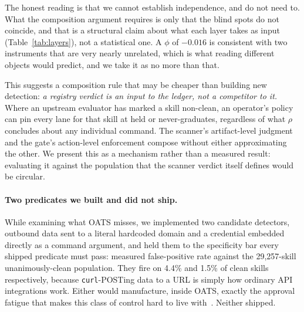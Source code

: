\documentclass[10pt]{article}
\begin{document}
The honest reading is that we cannot establish independence, and do not need to. What
the composition argument requires is only that the blind spots do not coincide, and
that is a structural claim about what each layer takes as input (Table~\ref{tab:layers}),
not a statistical one. A $\phi$ of $-0.016$ is consistent with two instruments that
are very nearly unrelated, which is what reading different objects would predict, and
we take it as no more than that.

This suggests a composition rule that may be cheaper than building new detection:
\emph{a registry verdict is an input to the ledger, not a competitor to it.} Where
an upstream evaluator has marked a skill non-clean, an operator's policy can pin
every lane for that skill at held or never-graduates, regardless of what $\rho$
concludes about any individual command. The scanner's artifact-level judgment and
the gate's action-level enforcement compose without either approximating the other.
We present this as a mechanism rather than a measured result: evaluating it against
the population that the scanner verdict itself defines would be circular.

\paragraph{Two predicates we built and did not ship.} While examining what OATS
misses, we implemented two candidate detectors, outbound data sent to a literal
hardcoded domain and a credential embedded directly as a command argument, and
held them to the specificity bar every shipped predicate must pass: measured
false-positive rate against the 29,257-skill unanimously-clean population. They fire
on 4.4\% and 1.5\% of clean skills respectively, because \texttt{curl}-POSTing data
to a URL is simply how ordinary API integrations work. Either would manufacture,
inside OATS, exactly the approval fatigue that makes this class of control hard to
live with~\cite{openclawroadmap}. Neither shipped.
\end{document}

